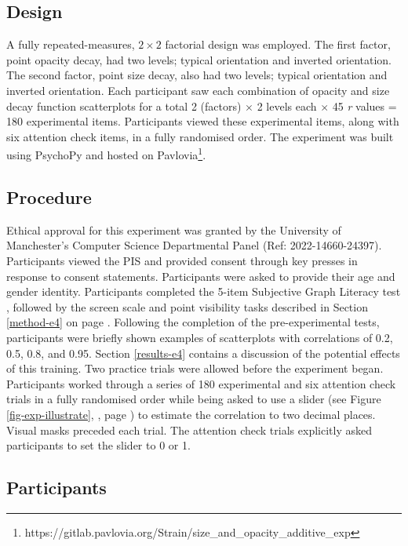 \documentclass[../main.tex]{subfiles}
\begin{document}
\subsection{Design}\label{design-e4}

A fully repeated-measures, \(2\times2\) factorial design was employed.
The first factor, point opacity decay, had two levels; typical
orientation and inverted orientation. The second factor, point size
decay, also had two levels; typical orientation and inverted
orientation. Each participant saw each combination of opacity and size
decay function scatterplots for a total 2 (factors) \(\times\) 2 levels
each \(\times\) 45 \emph{r} values = 180 experimental items.
Participants viewed these experimental items, along with six attention
check items, in a fully randomised order. The experiment was built using
PsychoPy and hosted on Pavlovia\footnote{https://gitlab.pavlovia.org/Strain/size\_and\_opacity\_additive\_exp}.

\subsection{Procedure}\label{procedure-e4}

Ethical approval for this experiment was granted by the University of
Manchester's Computer Science Departmental Panel (Ref:
2022-14660-24397). Participants viewed the PIS and provided consent
through key presses in response to consent statements. Participants were
asked to provide their age and gender identity. Participants completed
the 5-item Subjective Graph Literacy test \cite{garcia_2016}, followed
by the screen scale and point visibility tasks described in Section
\ref{method-e4} on page \pageref{method-e4}. Following the completion of
the pre-experimental tests, participants were briefly shown examples of
scatterplots with correlations of 0.2, 0.5, 0.8, and 0.95. Section
\ref{results-e4} contains a discussion of the potential effects of this
training. Two practice trials were allowed before the experiment began.
Participants worked through a series of 180 experimental and six
attention check trials in a fully randomised order while being asked to
use a slider (see Figure \ref{fig-exp-illustrate},
, page \pageref{fig-exp-illustrate}) to estimate
the correlation to two decimal places. Visual masks preceded each trial.
The attention check trials explicitly asked participants to set the
slider to 0 or 1.

\subsection{Participants}\label{participants-e4}
\end{document}
